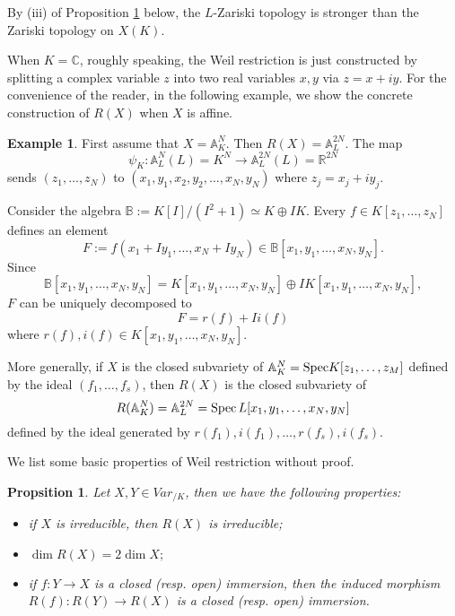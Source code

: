 \documentclass[12pt]{amsart}
\theoremstyle{plain}
\newtheorem{Prop}[Thm]{Propsition}
\theoremstyle{remark}
\theoremstyle{definition}
\newtheorem{Eg}[Thm]{Example}
\def\A{\mathbb A}
\def\B{\mathbb B}
\def\R{\mathbb R}
\def\C{\mathbb C}
\def\Spec{{\rm Spec}}
\begin{document}
By (iii) of Proposition \ref{probasicweil} below, the  $L$-Zariski topology is stronger than the Zariski topology on $X(K).$


\medskip

When $K=\C$,  roughly speaking, the Weil restriction is just constructed  by
splitting a complex variable $z$ into two real variables $x,y$ via $z=x+iy$.
For the convenience of the reader, in the following example, we show the concrete construction of $R(X)$  when $X$ is affine. 

\begin{Eg}
First assume that $X=\A^N_{K}$. Then $R(X)=\A^{2N}_{L}.$ The map $$\psi_{K}: \A^N_{L}(L)=K^N\to \A^{2N}_{L}(L)=\R^{2N}$$ sends $(z_1, \dots, z_N)$ to $(x_1, y_1, x_2,y_2,\dots, x_N,y_N)$ where $z_j=x_j+iy_j$.

\medskip
Consider the algebra $\B:=K[I]/(I^2+1)\simeq K\oplus IK$.
Every $f\in K[z_1,\dots,z_N]$ defines an element $$F:=f(x_1+Iy_1, \dots, x_N+Iy_N)\in \B[x_1,y_1,\dots, x_N,y_N].$$
Since $$\B[x_1,y_1,\dots, x_N,y_N]=K[x_1,y_1,\dots, x_N,y_N]\oplus IK[x_1,y_1,\dots, x_N,y_N],$$ $F$ can be uniquely decomposed to $$F=r(f)+Ii(f)$$ where $r(f), i(f)\in K[x_1,y_1,\dots,x_N,y_N].$

\medskip

More generally, if $X$ is the closed subvariety of $\A^N_K=\Spec K[z_1,\dots, z_M]$ defined by the ideal $(f_1,\dots, f_s)$, then $R(X)$ is the closed subvariety of 
$$R(\A^N_{K})=\A^{2N}_{L}=\Spec\, L[x_1,y_1,\dots, x_N,y_N]$$ defined by the ideal generated by $r(f_1), i(f_1),\dots, r(f_s), i(f_s)$.
\end{Eg}


\medskip






We list some basic properties of Weil restriction without proof.
\begin{Prop}\label{probasicweil}Let $X, Y\in Var_{/K}$, then we have the following properties: 
\begin{itemize}
\item if $X$ is irreducible, then $R(X)$ is irreducible;
\item $\dim R(X)=2\dim X;$
\item if $f:Y\to X$ is a closed (resp. open) immersion, then the induced morphism $R(f):R(Y)\to R(X)$ is a closed (resp. open) immersion.
\end{itemize}
\end{Prop}
\end{document}
